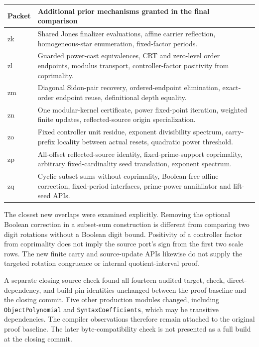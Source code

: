 \documentclass[11pt,letterpaper]{article}
\newcommand{\code}[1]{{\small\urlstyle{tt}\nolinkurl{#1}}}
\begin{document}
\begin{tabularx}{\textwidth}{@{}p{}X@{}}
\toprule
Packet & Additional prior mechanisms granted in the final comparison\\
\midrule
zk & Shared Jones finalizer evaluations, affine carrier reflection, homogeneous-star enumeration, fixed-factor periods.\\
zl & Guarded power-cast equivalences, CRT and zero-level order endpoints, modulus transport, controller-factor positivity from coprimality.\\
zm & Diagonal Sidon-pair recovery, ordered-endpoint elimination, exact-order endpoint reuse, definitional depth equality.\\
zn & One modular-kernel certificate, power fixed-point iteration, weighted finite updates, reflected-source origin specialization.\\
zo & Fixed controller unit residue, exponent divisibility spectrum, carry-prefix locality between actual resets, quadratic power threshold.\\
zp & All-offset reflected-source identity, fixed-prime-support coprimality, arbitrary fixed-cardinality seed translation, exponent spectrum.\\
zq & Cyclic subset sums without coprimality, Boolean-free affine correction, fixed-period interfaces, prime-power annihilator and lift-seed APIs.\\
\bottomrule
\end{tabularx}

The closest new overlaps were examined explicitly. Removing the optional
Boolean correction in a subset-sum construction is different from comparing
two digit rotations without a Boolean digit bound. Positivity of a controller
factor from coprimality does not imply the source port's sign from the first
two scale rows. The new finite carry and source-update APIs likewise do not
supply the targeted rotation congruence or internal quotient-interval proof.

A separate closing source check found all fourteen audited target, check,
direct-dependency, and build-pin identities unchanged between the proof
baseline and the closing commit. Five other production modules changed,
including \code{ObjectPolynomial} and \code{SyntaxCoefficients}, which may be
transitive dependencies. The compiler observations therefore remain attached
to the original proof baseline. The later byte-compatibility check is not
presented as a full build at the closing commit.
\end{document}
